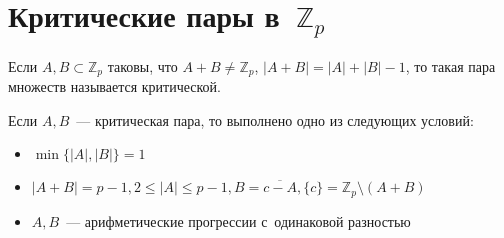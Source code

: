 \documentclass{article}
\begin{document}
\section{Критические пары в~$\mathbb{Z}_p$}

\begin{definition}
	Если $A, B \subset \mathbb{Z}_p$ таковы, что $A + B \ne \mathbb{Z}_p$, $|A +
	B| = |A| + |B| - 1$, то такая пара множеств называется критической.
\end{definition}

\begin{theorem}[Воспер]
	Если $A, B$~--- критическая пара, то выполнено одно из следующих условий:
	\begin{itemize}
		\item $\min\{|A|, |B|\} = 1$
		\item $|A + B| = p - 1, 2 \le |A| \le p - 1, B = \overline{c - A}, \{c\} =
			\mathbb{Z}_p \setminus (A + B)$
		\item $A, B$~--- арифметические прогрессии с~одинаковой разностью
	\end{itemize}
\end{theorem}
\end{document}
